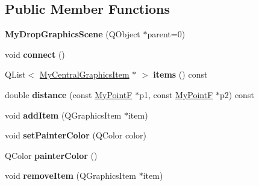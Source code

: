 \subsection*{Public Member Functions}
\begin{DoxyCompactItemize}
\item 
\hypertarget{class_my_drop_graphics_scene_a4f001c01ee3f40b7d7e41fbb7c93a42f}{}{\bfseries My\+Drop\+Graphics\+Scene} (Q\+Object $\ast$parent=0)\label{class_my_drop_graphics_scene_a4f001c01ee3f40b7d7e41fbb7c93a42f}

\item 
\hypertarget{class_my_drop_graphics_scene_a07c494016c9c30715f5c34e499448415}{}void {\bfseries connect} ()\label{class_my_drop_graphics_scene_a07c494016c9c30715f5c34e499448415}

\item 
\hypertarget{class_my_drop_graphics_scene_a692183e5780c07b03bf82398a6c585c6}{}Q\+List$<$ \hyperlink{class_my_central_graphics_item}{My\+Central\+Graphics\+Item} $\ast$ $>$ {\bfseries items} () const \label{class_my_drop_graphics_scene_a692183e5780c07b03bf82398a6c585c6}

\item 
\hypertarget{class_my_drop_graphics_scene_ab3153d2dde7fce4b850b933a973d3a67}{}double {\bfseries distance} (const \hyperlink{class_my_point_f}{My\+Point\+F} $\ast$p1, const \hyperlink{class_my_point_f}{My\+Point\+F} $\ast$p2) const \label{class_my_drop_graphics_scene_ab3153d2dde7fce4b850b933a973d3a67}

\item 
\hypertarget{class_my_drop_graphics_scene_acbfa92a87bc4177817c2549ec3ad0b67}{}void {\bfseries add\+Item} (Q\+Graphics\+Item $\ast$item)\label{class_my_drop_graphics_scene_acbfa92a87bc4177817c2549ec3ad0b67}

\item 
\hypertarget{class_my_drop_graphics_scene_a812d93b88a1179d99306b5b58b2e3a08}{}void {\bfseries set\+Painter\+Color} (Q\+Color color)\label{class_my_drop_graphics_scene_a812d93b88a1179d99306b5b58b2e3a08}

\item 
\hypertarget{class_my_drop_graphics_scene_ac2dac4faf1c3ba9f6358b470397ab249}{}Q\+Color {\bfseries painter\+Color} ()\label{class_my_drop_graphics_scene_ac2dac4faf1c3ba9f6358b470397ab249}

\item 
\hypertarget{class_my_drop_graphics_scene_a49e4e26f0864b0ba20221689b49c654b}{}void {\bfseries remove\+Item} (Q\+Graphics\+Item $\ast$item)\label{class_my_drop_graphics_scene_a49e4e26f0864b0ba20221689b49c654b}

\end{DoxyCompactItemize}

